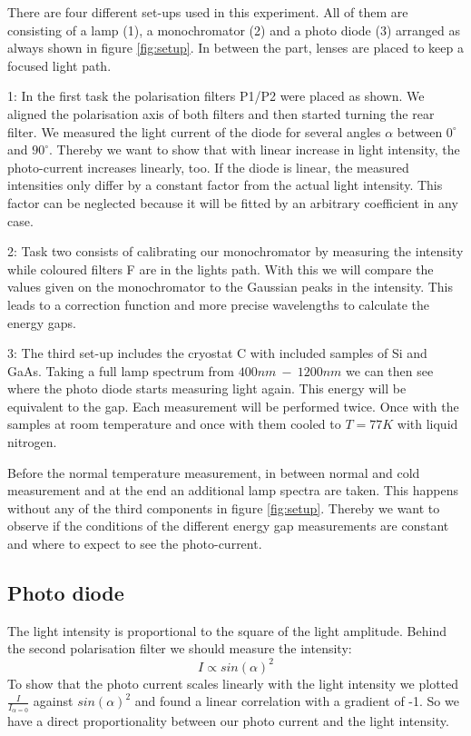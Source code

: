 \documentclass[]{article}
\begin{document}
There are four different set-ups used in this experiment. All of them are consisting of a lamp (1), a monochromator (2) and a photo diode (3) arranged as always shown in figure \ref{fig:setup}. In between the part, lenses are placed to keep a focused light path.

1: In the first task the polarisation filters P1/P2 were placed as shown. We aligned the polarisation axis of both filters and then started turning the rear filter. We measured the light current of the diode for several angles $\alpha$ between $0^\circ$ and $90^\circ$. Thereby we want to show that with linear increase in light intensity, the photo-current increases linearly, too. %
If the diode is linear, the measured intensities only differ by a constant factor from the actual light intensity. This factor can be neglected because it will be fitted by an arbitrary coefficient in any case.

2: Task two consists of calibrating our monochromator by measuring the intensity while coloured filters F are in the lights path. With this we will compare the values given on the monochromator to the Gaussian peaks in the intensity. This leads to a correction function and more precise wavelengths to calculate the energy gaps.

3: The third set-up includes the cryostat C with included samples of Si and GaAs. Taking a full lamp spectrum from $400nm \ - \ 1200nm$ we can then see where the photo diode starts measuring light again. This energy will be equivalent to the gap. Each measurement will be performed twice. Once with the samples at room temperature and once with them cooled to  $T=77K$ with liquid nitrogen.

Before the normal temperature measurement, in between normal and cold measurement and at the end an additional lamp spectra are taken. This happens without any of the third components in figure \ref{fig:setup}. Thereby we want to observe if the conditions of the different energy gap measurements are constant and where to expect to see the photo-current. 


\subsection{Photo diode}
The light intensity is proportional to the square of the light amplitude. Behind the second polarisation filter we should measure the intensity:
\begin{equation}
	I \propto sin(\alpha)^2
\end{equation}
To show that the photo current scales linearly with the light intensity we plotted $\frac{I}{I_{\alpha=0}}$ against $sin(\alpha)^2$ and found a linear correlation with a gradient of -1. So we have a direct proportionality between our photo current and the light intensity.
\end{document}
